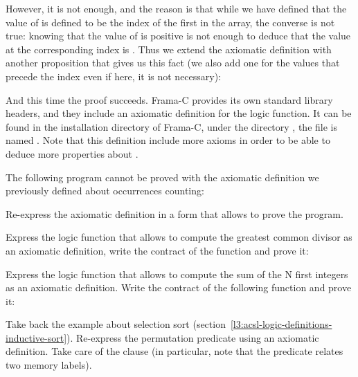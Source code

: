 


However, it is not enough, and the reason is that while we have defined
that the value of  is defined to be the index of
the first  in the array, the converse is
not true: knowing that the value of  is positive
is not enough to deduce that the value at the corresponding index is
. Thus we extend the axiomatic definition
with another proposition that gives us this fact (we also add one for the
values that precede the  index even if here, it is
not necessary):







And this time the proof succeeds. Frama-C provides its own standard
library headers, and they include an
axiomatic definition for the  logic function. It can
be found in the installation directory of Frama-C, under the directory
, the file is named .
Note that this definition include more axioms in order to be able to
deduce more properties about .







The following program cannot be proved with the axiomatic definition we
previously defined about occurrences counting:




Re-express the axiomatic definition in a form that allows to prove the
program.




Express the logic function that allows to compute the greatest common divisor as
an axiomatic definition, write the contract of the  function and
prove it:






Express the logic function that allows to compute the sum of the N first
integers as an axiomatic definition. Write the contract of the following
 function and prove it:






Take back the example about selection sort
(section~\ref{l3:acsl-logic-definitions-inductive-sort}). Re-express the
permutation predicate using an axiomatic definition. Take care of the
 clause (in particular, note that the predicate relates
two memory labels).


